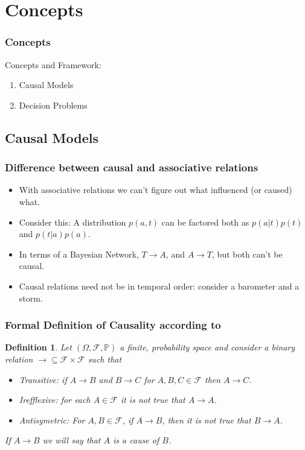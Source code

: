 \documentclass{beamer}
\theoremstyle{plain}
\newtheorem{defi}[teo]{Definition}
\begin{document}
\section{Concepts}
\begin{frame}
\frametitle{Concepts}
Concepts and Framework:
\begin{enumerate}
\item Causal Models
\item Decision Problems
\end{enumerate}
\end{frame}

\subsection{Causal Models}
		\begin{frame}
		\frametitle{Difference between causal and associative relations}
		\begin{itemize}
		\item With associative relations we can't figure out what influenced (or caused) what.
		\item Consider this: A distribution $p(a,t)$ can be factored both as $p(a|t)p(t)$ and $p(t|a)p(a)$. 
		\item In terms of a Bayesian Network, $T \to A$, and $A \to T$, but both can't be causal.
		\item Causal relations need not be in temporal order: consider a barometer and a storm.
		\end{itemize}
		\end{frame}
		
		\begin{frame}
		\frametitle{Formal Definition of Causality according to \cite{spirtes2000causation}}
		\begin{defi}
		Let $(\Omega, \mathcal{F}, \mathbb{P})$ a finite, probability space and consider a binary relation  $\to  \subseteq \mathcal{F} \times \mathcal{F}$ such that
		\begin{itemize}
		\item Transitive: if $A \to B$ and $B \to C$ for $A,B,C \in \mathcal{F}$ then $A \to C$.
		\item  Irefflexive: for each $A \in \mathcal{F}$ it is not true that $A \to A$.
		\item Antisymetric: For $A, B \in \mathcal{F}$, if $A \to B$, then it is not true that $B \to A$.
		\end{itemize}
		If $A \to B$ we will say that $A$ is a cause of $B$.
		\end{defi}
		\end{frame}
		
\end{document}

